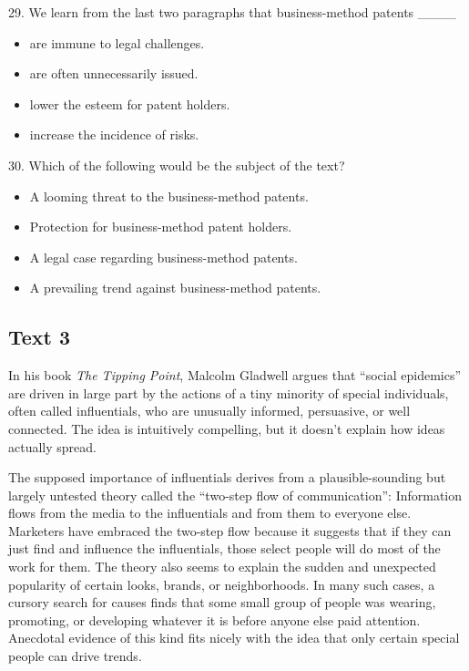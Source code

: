 \documentclass[UTF8,11pt]{ctexart}
\begin{document}
29. We learn from the last two paragraphs that business-method patents \_\_\_\_


\begin{itemize}[leftmargin=2em,itemsep=.2em,topsep=.4em]\item[A.] are immune to legal challenges.
\item[B.] are often unnecessarily issued.
\item[C.] lower the esteem for patent holders.
\item[D.] increase the incidence of risks.
\end{itemize}

30. Which of the following would be the subject of the text?


\begin{itemize}[leftmargin=2em,itemsep=.2em,topsep=.4em]\item[A.] A looming threat to the business-method patents.
\item[B.] Protection for business-method patent holders.
\item[C.] A legal case regarding business-method patents.
\item[D.] A prevailing trend against business-method patents.
\end{itemize}

\subsection*{\textbf{Text 3}}


In his book \textit{The Tipping Point}, Malcolm Gladwell argues that “social epidemics” are driven in large part by the actions of a tiny minority of special individuals, often called influentials, who are unusually informed, persuasive, or well connected. The idea is intuitively compelling, but it doesn’t explain how ideas actually spread.


The supposed importance of influentials derives from a plausible-sounding but largely untested theory called the “two-step flow of communication”: Information flows from the media to the influentials and from them to everyone else. Marketers have embraced the two-step flow because it suggests that if they can just find and influence the influentials, those select people will do most of the work for them. The theory also seems to explain the sudden and unexpected popularity of certain looks, brands, or neighborhoods. In many such cases, a cursory search for causes finds that some small group of people was wearing, promoting, or developing whatever it is before anyone else paid attention. Anecdotal evidence of this kind fits nicely with the idea that only certain special people can drive trends.
\end{document}
